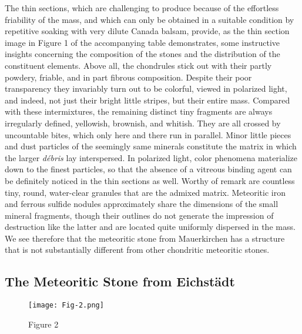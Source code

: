\documentclass[a4paper, 12pt, oneside]{article}
\begin{document}
The thin sections, which are challenging to produce because of the effortless friability of the mass, and which can only be obtained in a suitable condition by repetitive soaking with very dilute Canada balsam, provide, as the thin section image in Figure 1 of the accompanying table demonstrates, some instructive insights concerning the composition of the stones and the distribution of the constituent elements. Above all, the chondrules stick out with their partly powdery, friable, and in part fibrous composition. Despite their poor transparency they invariably turn out to be colorful, viewed in polarized light, and indeed, not just their bright little stripes, but their entire mass. Compared with these intermixtures, the remaining distinct tiny fragments are always irregularly defined, yellowish, brownish, and whitish. They are all crossed by uncountable bites, which only here and there run in parallel. Minor little pieces and dust particles of the seemingly same minerals constitute the matrix in which the larger \emph{débris} lay interspersed. In polarized light, color phenomena materialize down to the finest particles, so that the absence of a vitreous binding agent can be definitely noticed in the thin sections as well. Worthy of remark are countless tiny, round, water-clear granules that are the admixed matrix. Meteoritic iron and ferrous sulfide nodules approximately share the dimensions of the small mineral fragments, though their outlines do not generate the impression of destruction like the latter and are located quite uniformly dispersed in the mass. We see therefore that the meteoritic stone from Mauerkirchen has a structure that is not substantially different from other chondritic meteoritic stones.
\clearpage
\subsection{The Meteoritic Stone from Eichstädt}
\begin{figure}[h]
\centering
\texttt{[image: Fig-2.png]}
\caption{Figure 2}
\end{figure}
\end{document}
